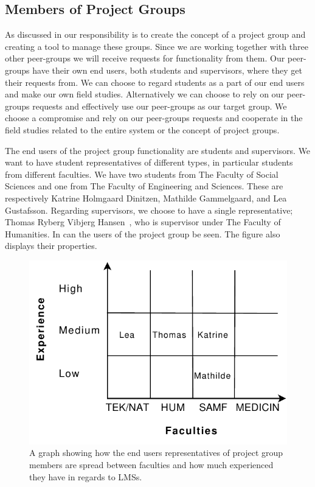 \subsection{Members of Project Groups}
\label{sub:endusersmembers}
As discussed in  our responsibility is to create the concept of a project group and creating a tool to manage these groups.
Since we are working together with three other peer-groups we will receive requests for functionality from them.
Our peer-groups have their own end users, both students and supervisors, where they get their requests from.
We can choose to regard students as a part of our end users and make our own field studies.
Alternatively we can choose to rely on our peer-groups requests and effectively use our peer-groups as our target group.
We choose a compromise and rely on our peer-groups requests and cooperate in the field studies related to the entire system or the concept of project groups.

The end users of the project group functionality are students and supervisors.
We want to have student representatives of different types, in particular students from different faculties.
We have two students from The Faculty of Social Sciences and one from The Faculty of Engineering and Sciences.
These are respectively Katrine Holmgaard Dinitzen, Mathilde Gammelgaard, and Lea Gustafsson.
Regarding supervisors, we choose to have a single representative; Thomas Ryberg Vibjerg Hansen~\cite{thomas}, who is supervisor under The Faculty of Humanities.
In  can the users of the project group be seen. 
The figure also displays their properties.

\begin{figure}%
\center
\includegraphics[]{images/MembersofpROJECTgROUJP}%
\caption{A graph showing how the end users representatives of project group members are spread between faculties and how much experienced they have in regards to LMSs.}%
\label{fig:memPG}%
\end{figure}

